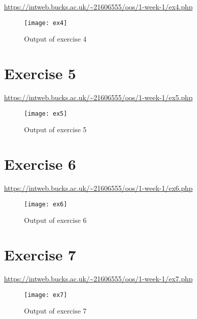\url{https://intweb.bucks.ac.uk/~21606555/oos/1-week-1/ex4.php}
\captionsetup{type=figure}


\begin{figure}[H]
  \caption{Output of exercise 4}
  \centering
  \texttt{[image: ex4]}
\end{figure}

\clearpage
\section{Exercise 5}

\url{https://intweb.bucks.ac.uk/~21606555/oos/1-week-1/ex5.php}
\captionsetup{type=figure}


\begin{figure}[H]
  \caption{Output of exercise 5}
  \centering
  \texttt{[image: ex5]}
\end{figure}

\section{Exercise 6}

\url{https://intweb.bucks.ac.uk/~21606555/oos/1-week-1/ex6.php}
\captionsetup{type=figure}


\begin{figure}[H]
  \caption{Output of exercise 6}
  \centering
  \texttt{[image: ex6]}
\end{figure}

\section{Exercise 7}

\url{https://intweb.bucks.ac.uk/~21606555/oos/1-week-1/ex7.php}
\captionsetup{type=figure}


\begin{figure}[H]
  \caption{Output of exercise 7}
  \centering
  \texttt{[image: ex7]}
\end{figure}
